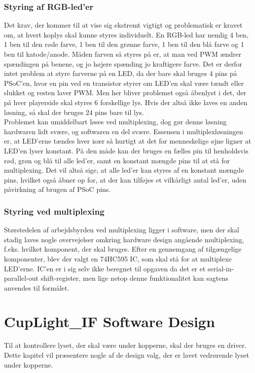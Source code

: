 \documentclass[Softwaredesign/Softwaredesign\_main.tex]{subfiles}
\begin{document}
\subsubsection{Styring af RGB-led'er}
Det krav, der kommer til at vise sig ekstremt vigtigt og problematisk er kravet om, at hvert koplys skal kunne styres individuelt. En RGB-led har nemlig 4 ben, 1 ben til den røde farve, 1 ben til den grønne farve, 1 ben til den blå farve og 1 ben til katode/anode. Måden farven så styres på er, at man ved PWM ændrer spændingen på benene, og jo højere spænding jo kraftigere farve. Det er derfor intet problem at styre farverne på en LED, da der bare skal bruges 4 pins på PSoC'en, hvor en pin ved en transistor styrer om LED'en skal være tændt eller slukket og resten laver PWM. Men her bliver problemet også åbenlyst i det, der på hver playerside skal styres 6 forskellige lys. Hvis der altså ikke laves en anden løsning, så skal der bruges 24 pins bare til lys. 
\\Problemet kan umiddelbart løses ved multiplexing, dog gør denne løsning hardwaren lidt svære, og softwaren en del svære. Essensen i multiplexløsningen er, at LED'erne tændes hver især så hurtigt at det for menneskelige øjne ligner at LED'en lyser konstant. På den måde kan der bruges en fælles pin til henholdsvis rød, grøn og blå til alle led'er, samt en konstant mængde pins til at stå for multiplexing. Det vil altså sige, at alle led'er kan styres af en konstant mængde pins, hvilket også åbner op for, at der kan tilføjes et vilkårligt antal led'er, uden påvirkning af brugen af PSoC pins.
\subsubsection{Styring ved multiplexing}
Størstedelen af arbejdsbyrden ved multiplexing ligger i software, men der skal stadig laves nogle overvejelser omkring hardware design angående multiplexing, f.eks. hvilket komponent, der skal bruges. Efter en gennemgang af tilgængelige komponenter, blev der valgt en 74HC595 IC, som skal stå for at multiplexe LED'erne. IC'en er i sig selv ikke beregnet til opgaven da det er et serial-in-parallel-out shift-register, men lige netop denne funktionalitet kan sagtens anvendes til formålet.    

\section{CupLight\_IF Software Design}
Til at kontrollere lyset, der skal være under kopperne, skal der bruges en driver. Dette kapitel vil præsentere nogle af de design valg, der er lavet vedrørende lyset under kopperne.
\end{document}
